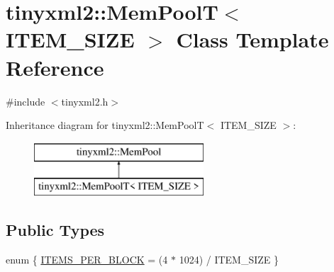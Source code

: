 \hypertarget{classtinyxml2_1_1_mem_pool_t}{}\section{tinyxml2\+:\+:Mem\+PoolT$<$ I\+T\+E\+M\+\_\+\+S\+I\+ZE $>$ Class Template Reference}
\label{classtinyxml2_1_1_mem_pool_t}


{\ttfamily \#include $<$tinyxml2.\+h$>$}

Inheritance diagram for tinyxml2\+:\+:Mem\+PoolT$<$ I\+T\+E\+M\+\_\+\+S\+I\+ZE $>$\+:\begin{figure}[H]
\begin{center}
\leavevmode
\includegraphics[height=2.000000cm]{classtinyxml2_1_1_mem_pool_t}
\end{center}
\end{figure}
\subsection*{Public Types}
\begin{DoxyCompactItemize}
\item 
enum \{ \mbox{\hyperlink{classtinyxml2_1_1_mem_pool_t_a04cf45156e6f913f93972869ff8a1d94ab72c1e16d6626854c41feb19e60c54d1}{I\+T\+E\+M\+S\+\_\+\+P\+E\+R\+\_\+\+B\+L\+O\+CK}} = (4 $\ast$ 1024) / I\+T\+E\+M\+\_\+\+S\+I\+ZE
 \}
\end{DoxyCompactItemize}

